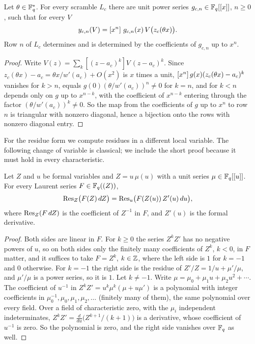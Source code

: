 \begin{lemma}\label{lem:riordan}
Let $\theta\in\mathbb{F}_q^*$. For every scramble $L_c$ there are unit power series $g_{c,n}\in\mathbb{F}_q[[x]]$, $n\ge0$, such that for every $V$
\[
y_{c,n}(V)=[x^{n}]\,\,g_{c,n}(x)\,V\bigl(z_c(\theta x)\bigr).
\]
Row $n$ of $L_c$ determines and is determined by the coefficients of $g_{c,n}$ up to $x^n$.
\end{lemma}

\begin{proof}
Write $V(z)=\sum_k[(z-a_c)^k]V\,(z-a_c)^k$. Since $z_c(\theta x)-a_c=\theta x/w'(a_c)+O(x^2)$ is $x$ times a unit, $[x^{n}]\,g(x)(z_c(\theta x)-a_c)^k$ vanishes for $k>n$, equals $g(0)(\theta/w'(a_c))^n\ne0$ for $k=n$, and for $k<n$ depends only on $g$ up to $x^{n-k}$, with the coefficient of $x^{n-k}$ entering through the factor $(\theta/w'(a_c))^k\ne0$. So the map from the coefficients of $g$ up to $x^n$ to row $n$ is triangular with nonzero diagonal, hence a bijection onto the rows with nonzero diagonal entry.
\end{proof}

For the residue form we compute residues in a different local variable. The following change of variable is classical; we include the short proof because it must hold in every characteristic.

\begin{lemma}\label{lem:reschange}
Let $Z$ and $u$ be formal variables and $Z=u\,\mu(u)$ with a unit series $\mu\in\mathbb{F}_q[[u]]$. For every Laurent series $F\in\mathbb{F}_q((Z))$,
\[
\operatorname{Res}_Z\bigl(F(Z)\,dZ\bigr)=\operatorname{Res}_u\bigl(F(Z(u))\,Z'(u)\,du\bigr),
\]
where $\operatorname{Res}_Z(F\,dZ)$ is the coefficient of $Z^{-1}$ in $F$, and $Z'(u)$ is the formal derivative.
\end{lemma}

\begin{proof}
Both sides are linear in $F$. For $k\ge0$ the series $Z^kZ'$ has no negative powers of $u$, so on both sides only the finitely many coefficients of $Z^k$, $k<0$, in $F$ matter, and it suffices to take $F=Z^k$, $k\in\mathbb{Z}$, where the left side is $1$ for $k=-1$ and $0$ otherwise. For $k=-1$ the right side is the residue of $Z'/Z=1/u+\mu'/\mu$, and $\mu'/\mu$ is a power series, so it is $1$. Let $k\ne-1$. Write $\mu=\mu_0+\mu_1u+\mu_2u^2+\cdots$. The coefficient of $u^{-1}$ in $Z^kZ'=u^k\mu^k(\mu+u\mu')$ is a polynomial with integer coefficients in $\mu_0^{-1},\mu_0,\mu_1,\mu_2,\dots$ (finitely many of them), the same polynomial over every field. Over a field of characteristic zero, with the $\mu_i$ independent indeterminates, $Z^kZ'=\frac{d}{du}\bigl(Z^{k+1}/(k+1)\bigr)$ is a derivative, whose coefficient of $u^{-1}$ is zero. So the polynomial is zero, and the right side vanishes over $\mathbb{F}_q$ as well.
\end{proof}

